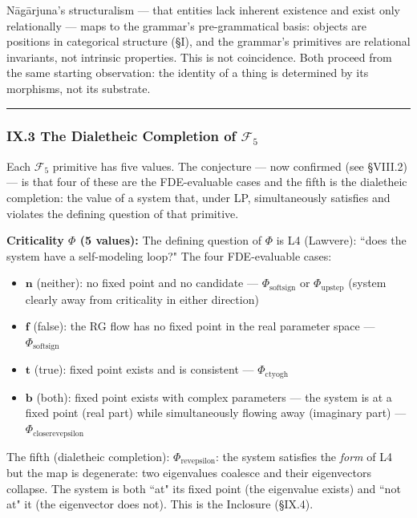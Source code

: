 \documentclass[12pt,a4paper]{article}
\newcommand{\pilcrow}{\S}
\begin{document}
N\={a}g\={a}rjuna's structuralism --- that entities lack inherent existence and exist only relationally --- maps to the grammar's pre-grammatical basis: objects are positions in categorical structure (\pilcrow{}I), and the grammar's primitives are relational invariants, not intrinsic properties. This is not coincidence. Both proceed from the same starting observation: the identity of a thing is determined by its morphisms, not its substrate.

\begin{center}
\rule{0.5\textwidth}{0.4pt}
\end{center}

\subsubsection{IX.3 The Dialetheic Completion of $\mathcal{F}_5$}
Each $\mathcal{F}_5$ primitive has five values. The conjecture --- now confirmed (see \S VIII.2) --- is that four of these are the FDE-evaluable cases and the fifth is the dialetheic completion: the value of a system that, under LP, simultaneously satisfies and violates the defining question of that primitive.

\textbf{Criticality $\Phi$ (5 values):}
The defining question of $\Phi$ is L4 (Lawvere): ``does the system have a self-modeling loop?" The four FDE-evaluable cases:
\begin{itemize}
\item $\mathbf{n}$ (neither): no fixed point and no candidate --- $\Phi_{\text{softsign}}$ or $\Phi_{\text{upstep}}$ (system clearly away from criticality in either direction)
\item $\mathbf{f}$ (false): the RG flow has no fixed point in the real parameter space --- $\Phi_{\text{softsign}}$
\item $\mathbf{t}$ (true): fixed point exists and is consistent --- $\Phi_{\text{ctyogh}}$
\item $\mathbf{b}$ (both): fixed point exists with complex parameters --- the system is at a fixed point (real part) while simultaneously flowing away (imaginary part) --- $\Phi_{\text{closerevepsilon}}$
\end{itemize}
The fifth (dialetheic completion): $\Phi_{\text{revepsilon}}$: the system satisfies the \emph{form} of L4 but the map is degenerate: two eigenvalues coalesce and their eigenvectors collapse. The system is both ``at" its fixed point (the eigenvalue exists) and ``not at" it (the eigenvector does not). This is the Inclosure (\pilcrow{}IX.4).
\end{document}
